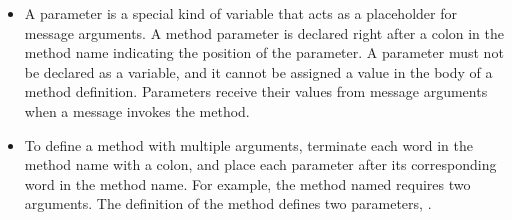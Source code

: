 \documentclass[a4paper,10pt,twoside]{book}
\begin{document}
\begin{itemize}
	\item A parameter is a special kind of variable that acts as a placeholder for message arguments. A method parameter is declared right after a colon in the method name indicating the position of the parameter. A parameter must not be declared as a variable, and it cannot be assigned a value in the body of a method definition. Parameters receive their values from message arguments when a message invokes the method. 

	\item To define a method with multiple arguments, terminate each word in the method name 
with a colon, and place each parameter after its corresponding word in the method 
name. For example, the method named  requires two arguments. The 
definition of the method  defines two 
parameters, . 

\end{itemize}

\ifx\wholebook\relax\else
    
\end{document}
